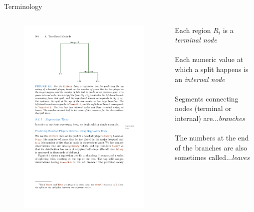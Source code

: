 \documentclass[mathserif, aspectratio=169]{beamer}
\begin{document}
\begin{frame}{Terminology}

\begin{columns}
\begin{figure}
\includegraphics[height=0.65\textheight]{simple_tree}
\caption*{}
\end{figure}



Each region $R_i$ is a \textit{terminal node}\\~\\

Each numeric value at which a split happens is an \textit{internal node} \\~\\

Segments connecting nodes (terminal or internal) are...\pause \textit{branches}\\~\\

\pause
The numbers at the end of the branches are also sometimes called...\pause \textit{leaves}

\end{columns}
\end{frame}
\end{document}
